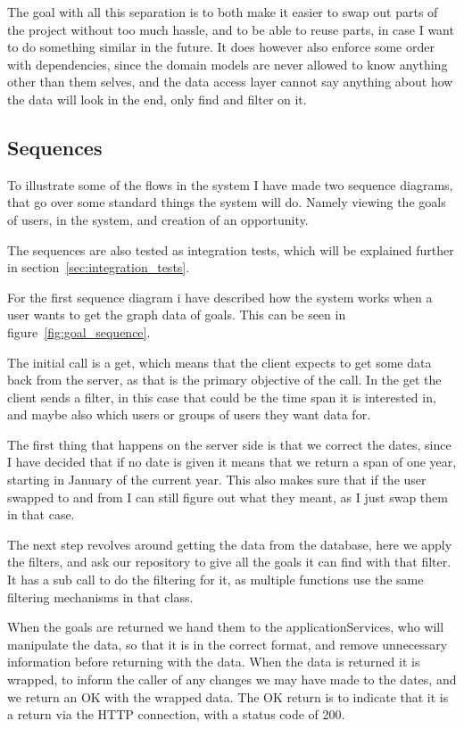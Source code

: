 The goal with all this separation is to both make it easier to swap out parts of
the project without too much hassle, and to be able to reuse parts, in case I
want to do something similar in the future. It does however also enforce some
order with dependencies, since the domain models are never allowed to know
anything other than them selves, and the data access layer cannot say anything
about how the data will look in the end, only find and filter on it. 

\subsection{Sequences}
\label{subsec:sequences}
To illustrate some of the flows in the system I have made two sequence diagrams,
that go over some standard things the system will do. Namely viewing the goals
of users, in the system, and creation of an opportunity.

The sequences are also tested as integration tests, which will be explained
further in section~\ref{sec:integration_tests}.

For the first sequence diagram i have described how the system works when a user
wants to get the graph data of goals. This can be seen in
figure~\ref{fig:goal_sequence}.

The initial call is a get, which means that the client expects to get some data
back from the server, as that is the primary objective of the call. In the get
the client sends a filter, in this case that could be the time span it is
interested in, and maybe also which users or groups of users they want data for.

The first thing that happens on the server side is that we correct the dates,
since I have decided that if no date is given it means that we return a span of
one year, starting in January of the current year. This also makes sure that if
the user swapped to and from I can still figure out what they meant, as I just
swap them in that case. 

The next step revolves around getting the data from the database, here we apply
the filters, and ask our repository to give all the goals it can find with that
filter. It has a sub call to do the filtering for it, as multiple functions use
the same filtering mechanisms in that class.

When the goals are returned we hand them to the applicationServices, who will
manipulate the data, so that it is in the correct format, and remove unnecessary
information before returning with the data. When the data is returned it is
wrapped, to inform the caller of any changes we may have made to the dates, and
we return an OK with the wrapped data. The OK return is to indicate that it is a
return via the HTTP connection, with a status code of 200.

